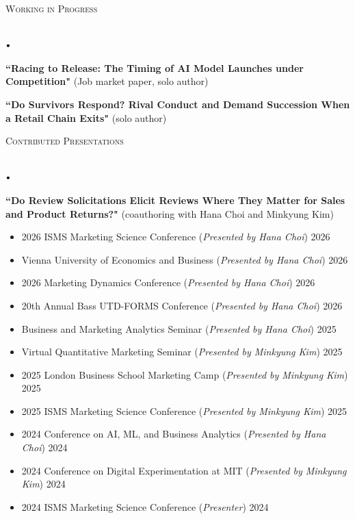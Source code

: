 \documentclass[11pt]{article}
\newcommand{\lineunder}{\vspace*{-8pt} \\ \hspace*{-18pt} \hrulefill \\}
\newcommand{\header}[1]{{\hspace*{-15pt}\vspace*{6pt} \textsc{#1}} \vspace*{-6pt} \lineunder}
\newcommand{\lbt}{\,\begin{picture}(-1,1)(-1,-3)\circle*{3}\end{picture}\ }
\newenvironment{achievements}{
    \begin{list}{$\lbt$}{
        \topsep 0pt
        \itemsep 0pt
        \addtolength{\leftmargin}{-0.1in}
    }
}
{
    \vspace*{4pt}
    \end{list}
}
\begin{document}
\header{\Large{Working in Progress}}
\vspace{2mm}
\begin{achievements}
\item \textbf{``Racing to Release: The Timing of AI Model Launches under Competition"} (Job market paper, solo author)
\item \textbf{``Do Survivors Respond? Rival Conduct and Demand Succession When a Retail Chain Exits"} (solo author)
\end{achievements}
\bigskip


\header{\Large{Contributed Presentations}}
\vspace{2mm}
\begin{achievements}
    \item \textbf{``Do Review Solicitations Elicit Reviews Where They Matter for Sales and Product Returns?"} (coauthoring with Hana Choi and Minkyung Kim)
    \begin{itemize}
        \item[-] 2026 ISMS Marketing Science Conference (\textit{Presented by Hana Choi}) \hfill{} 2026
        \item[-] Vienna University of Economics and Business (\textit{Presented by Hana Choi}) \hfill{} 2026
        \item[-] 2026 Marketing Dynamics Conference (\textit{Presented by Hana Choi}) \hfill{} 2026
        \item[-] 20th Annual Bass UTD-FORMS Conference (\textit{Presented by Hana Choi}) \hfill{} 2026
        \item[-] Business and Marketing Analytics Seminar (\textit{Presented by Hana Choi}) \hfill{} 2025
        \item[-] Virtual Quantitative Marketing Seminar (\textit{Presented by Minkyung Kim}) \hfill{} 2025
        \item[-] 2025 London Business School Marketing Camp (\textit{Presented by Minkyung Kim}) \hfill{} 2025
        \item[-] 2025 ISMS Marketing Science Conference (\textit{Presented by Minkyung Kim}) \hfill{} 2025
        \item[-] 2024 Conference on AI, ML, and Business Analytics (\textit{Presented by Hana Choi}) \hfill{} 2024
        \item[-] 2024 Conference on Digital Experimentation at MIT (\textit{Presented by Minkyung Kim}) \hfill{} 2024
        \item[-] 2024 ISMS Marketing Science Conference (\textit{Presenter}) \hfill{} 2024
    \end{itemize}
\end{achievements}
\bigskip
\end{document}
